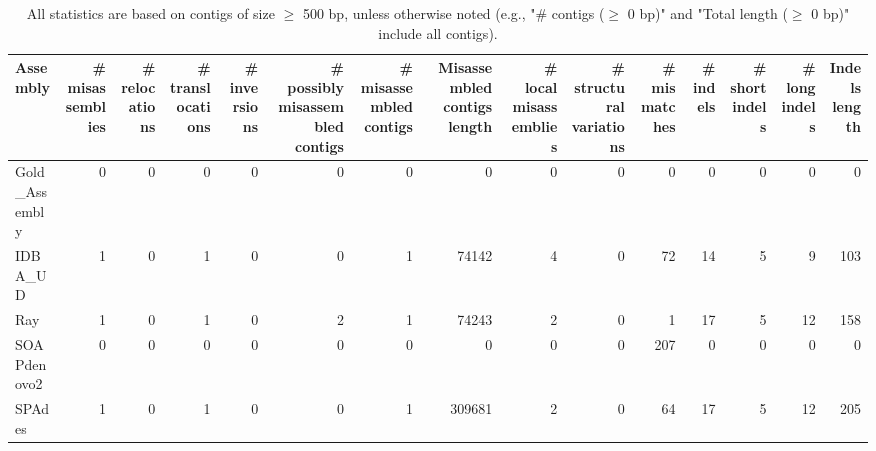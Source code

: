 \documentclass[12pt,a4paper]{article}
\begin{document}
\begin{table}[ht]
\begin{center}
\caption{All statistics are based on contigs of size $\geq$ 500 bp, unless otherwise noted (e.g., "\# contigs ($\geq$ 0 bp)" and "Total length ($\geq$ 0 bp)" include all contigs).}
\begin{tabular}{|l*{14}{|r}|}
\hline
Assembly & \# misassemblies &     \# relocations &     \# translocations &     \# inversions & \# possibly misassembled contigs & \# misassembled contigs & Misassembled contigs length & \# local misassemblies & \# structural variations & \# mismatches & \# indels &     \# short indels &     \# long indels & Indels length \\ \hline
Gold\_Assembly & 0 & 0 & 0 & 0 & 0 & 0 & 0 & 0 & 0 & 0 & 0 & 0 & 0 & 0 \\ \hline
IDBA\_UD & 1 & 0 & 1 & 0 & 0 & 1 & 74142 & 4 & 0 & 72 & 14 & 5 & 9 & 103 \\ \hline
Ray & 1 & 0 & 1 & 0 & 2 & 1 & 74243 & 2 & 0 & 1 & 17 & 5 & 12 & 158 \\ \hline
SOAPdenovo2 & 0 & 0 & 0 & 0 & 0 & 0 & 0 & 0 & 0 & 207 & 0 & 0 & 0 & 0 \\ \hline
SPAdes & 1 & 0 & 1 & 0 & 0 & 1 & 309681 & 2 & 0 & 64 & 17 & 5 & 12 & 205 \\ \hline
\end{tabular}
\end{center}
\end{table}
\end{document}
